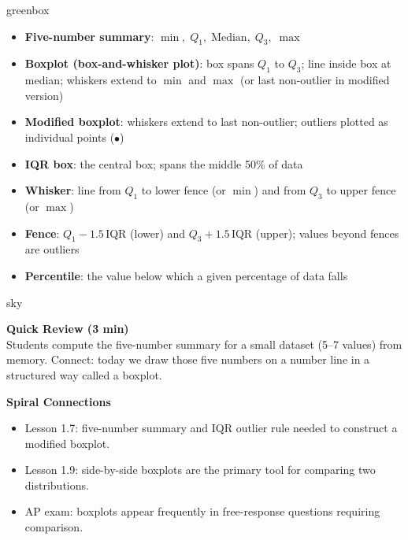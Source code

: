 \documentclass[10pt]{article}
\begin{document}
\begin{skillbox}{greenbox}
\begin{minipage}[t]{0.48\linewidth}
    \begin{itemize}
        \item \textbf{Five-number summary}: $\min,\; Q_1,\; \text{Median},\; Q_3,\; \max$
        \item \textbf{Boxplot (box-and-whisker plot)}: box spans $Q_1$ to $Q_3$; line inside box at median; whiskers extend to $\min$ and $\max$ (or last non-outlier in modified version)
        \item \textbf{Modified boxplot}: whiskers extend to last non-outlier; outliers plotted as individual points ($\bullet$)
    \end{itemize}
\end{minipage}
\hfill
\begin{minipage}[t]{0.48\linewidth}
    \begin{itemize}
        \item \textbf{IQR box}: the central box; spans the middle 50\% of data
        \item \textbf{Whisker}: line from $Q_1$ to lower fence (or $\min$) and from $Q_3$ to upper fence (or $\max$)
        \item \textbf{Fence}: $Q_1 - 1.5\,\text{IQR}$ (lower) and $Q_3 + 1.5\,\text{IQR}$ (upper); values beyond fences are outliers
        \item \textbf{Percentile}: the value below which a given percentage of data falls
    \end{itemize}
\end{minipage}
\end{skillbox}

\begin{skillbox}{sky}
\begin{minipage}[t]{0.48\linewidth}
    \textbf{Quick Review (3 min)}\\
    Students compute the five-number summary for a small dataset (5--7 values) from memory. Connect: today we draw those five numbers on a number line in a structured way called a boxplot.
\end{minipage}
\hfill
\begin{minipage}[t]{0.48\linewidth}
    \textbf{Spiral Connections}
    \begin{itemize}
        \item Lesson 1.7: five-number summary and IQR outlier rule needed to construct a modified boxplot.
        \item Lesson 1.9: side-by-side boxplots are the primary tool for comparing two distributions.
        \item AP exam: boxplots appear frequently in free-response questions requiring comparison.
    \end{itemize}
\end{minipage}
\end{skillbox}
\end{document}
